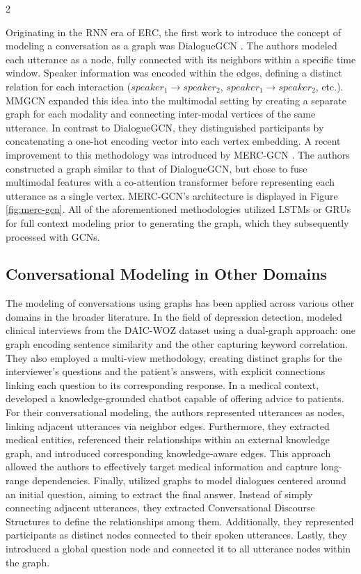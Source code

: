 \documentclass[10pt]{article}
\begin{document}
\begin{multicols}{2}
\par Originating in the RNN era of ERC, the first work to introduce the concept
of modeling a conversation as a graph was DialogueGCN
\cite{ghosalDialogueGCNGraphConvolutional2019}. The authors modeled each
utterance as a node, fully connected with its neighbors within a specific time
window. Speaker information was encoded within the edges, defining a distinct
relation for each interaction ($speaker_1 \rightarrow speaker_2$,
$speaker_1 \rightarrow speaker_2$, etc.). MMGCN \cite{huMMGCNMultimodalFusion2021}
expanded this idea into the multimodal setting by creating a separate graph for
each modality and connecting inter-modal vertices of the same utterance. In
contrast to DialogueGCN, they distinguished participants by concatenating a
one-hot encoding vector into each vertex embedding. A recent improvement to
this methodology was introduced by MERC-GCN
\cite{fengCrossmodalContextFusion2025}. The authors constructed a graph similar
to that of DialogueGCN, but chose to fuse multimodal features with a
co-attention transformer before representing each utterance as a single vertex.
MERC-GCN's architecture is displayed in Figure \ref{fig:merc-gcn}.
All of the aforementioned methodologies utilized LSTMs or GRUs for full context
modeling prior to generating the graph, which they subsequently processed with
GCNs.

\subsection{Conversational Modeling in Other Domains}
\par The modeling of conversations using graphs has been applied across various
other domains in the broader literature. In the field of depression detection,
\cite{xiaDepressionDetectionModel2024} modeled clinical interviews from the
DAIC-WOZ dataset using a dual-graph approach: one graph encoding sentence
similarity and the other capturing keyword correlation. They also employed a
multi-view methodology, creating distinct graphs for the interviewer's
questions and the patient's answers, with explicit connections linking each
question to its corresponding response. In a medical context,
\cite{zhaoMedicalDialogueResponse2022} developed a knowledge-grounded chatbot
capable of offering advice to patients. For their conversational modeling, the
authors represented utterances as nodes, linking adjacent utterances via
neighbor edges. Furthermore, they extracted medical entities, referenced their
relationships within an external knowledge graph, and introduced corresponding
knowledge-aware edges. This approach allowed the authors to effectively target
medical information and capture long-range dependencies. Finally,
\cite{liGLGRQuestionawareGlobaltoLocal2023} utilized graphs to model dialogues
centered around an initial question, aiming to extract the final answer.
Instead of simply connecting adjacent utterances, they extracted Conversational
Discourse Structures to define the relationships among them. Additionally, they
represented participants as distinct nodes connected to their spoken
utterances. Lastly, they introduced a global question node and connected it to
all utterance nodes within the graph.



\end{multicols}
\end{document}
